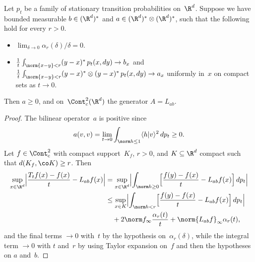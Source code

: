 \begin	{theorem}
Let $p_t$ be a family of stationary transition probabilities on~$\R^d$.
Suppose we have bounded measurable \( b \in (\R^d)^* \)
and \( a \in (\R^d)^*\otimes(\R^d)^* \),
such that the following hold for every \( r > 0 \).
\begin	{itemize}
\item	\( \lim_{\delta\to0} \alpha_r(\delta)/\delta = 0 \).
\item	\( \tfrac1t\int_{\norm{x-y}<r} (y-x)^* \,p_t(x,dy) \to b_x \)
	and \( \tfrac1t\int_{\norm{x-y}<r} (y-x)^* \otimes (y-x)^*
		\,p_t(x,dy) \to a_x \)
	uniformly in~$x$ on compact sets as \( t \to 0 \).
\end	{itemize}
Then \( a \ge 0 \),
and on~$\Cont^2_c(\R^d)$ the generator \( A = L_{ab} \).
\end	{theorem}
\begin	{proof}
The bilinear operator~$a$ is positive since
\[ a(v,v) = \lim_{t\to0} \int_{\norm h\le1} \langle h\vert v\rangle^2 \,dp_t
	\ge 0 \text. \]
Let \( f \in \Cont^2_\mathrm c \) with compact support~$K_f$, \( r > 0 \),
and \( K \subseteq \R^d \) compact such that \( d(K_f,\co K) \ge r \).
Then
\begin	{align*}
	\sup_{x\in\R^d} \Bigl\lvert
		\frac{T_t f(x) - f(x)}{t} - L_{ab}f(x)
	\Bigr\rvert
	&= \sup_{x\in\R^d} \Bigl\lvert
		\int_{\norm h\ge0}\Bigl[
			\frac{f(y)-f(x)}{t} - L_{ab}f(x)
		\Bigr] \,dp_t
	   \Bigr\rvert \\
	&\le \sup_{x\in K} \Bigl\lvert
			\int_{\norm h<r}\Bigl[
				\frac{f(y)-f(x)}{t} - L_{ab}f(x)
			\Bigr] \,dp_t
		\Bigr\rvert \\
	&\quad	+ 2\norm f_\infty \frac{\alpha_r(t)}{t}
		+ \norm{L_{ab}f}_\infty \alpha_r(t)
	\text,
\end	{align*}
and the final terms \( \to 0 \) with~$t$
by the hypothesis on~$\alpha_r(\delta)$,
while the integral term \( \to 0 \) with $t$ and~$r$
by using Taylor expansion on~$f$
and then the hypotheses on $a$ and~$b$.
\end	{proof}

